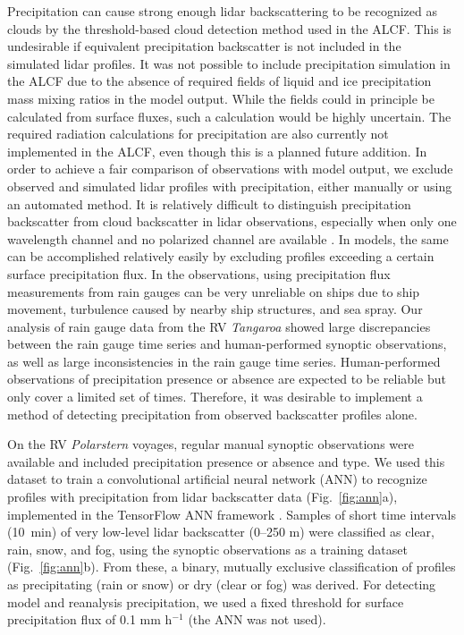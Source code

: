 \documentclass[draft]{agujournal2019}
\begin{document}
Precipitation can cause strong enough lidar backscattering to be recognized as clouds by the threshold-based cloud detection method used in the ALCF. This is undesirable if equivalent precipitation backscatter is not included in the simulated lidar profiles. It was not possible to include precipitation simulation in the ALCF due to the absence of required fields of liquid and ice precipitation mass mixing ratios in the model output. While the fields could in principle be calculated from surface fluxes, such a calculation would be highly uncertain. The required radiation calculations for precipitation are also currently not implemented in the ALCF, even though this is a planned future addition. In order to achieve a fair comparison of observations with model output, we exclude observed and simulated lidar profiles with precipitation, either manually or using an automated method. It is relatively difficult to distinguish precipitation backscatter from cloud backscatter in lidar observations, especially when only one wavelength channel and no polarized channel are available \cite{kim2020}. In models, the same can be accomplished relatively easily by excluding profiles exceeding a certain surface precipitation flux. In the observations, using precipitation flux measurements from rain gauges can be very unreliable on ships due to ship movement, turbulence caused by nearby ship structures, and sea spray. Our analysis of rain gauge data from the RV \emph{Tangaroa} showed large discrepancies between the rain gauge time series and human-performed synoptic observations, as well as large inconsistencies in the rain gauge time series. Human-performed observations of precipitation presence or absence are expected to be reliable but only cover a limited set of times. Therefore, it was desirable to implement a method of detecting precipitation from observed backscatter profiles alone.

On the RV \emph{Polarstern} voyages, regular manual synoptic observations were available and included precipitation presence or absence and type. We used this dataset to train a convolutional artificial neural network (ANN) to recognize profiles with precipitation from lidar backscatter data (Fig.~\ref{fig:ann}a), implemented in the TensorFlow ANN framework \cite{tensorflow}. Samples of short time intervals (10~min) of very low-level lidar backscatter (0–250 m) were classified as clear, rain, snow, and fog, using the synoptic observations as a training dataset (Fig.~\ref{fig:ann}b). From these, a binary, mutually exclusive classification of profiles as precipitating (rain or snow) or dry (clear or fog) was derived. For detecting model and reanalysis precipitation, we used a fixed threshold for surface precipitation flux of 0.1 mm h$^{-1}$ (the ANN was not used).
\end{document}
